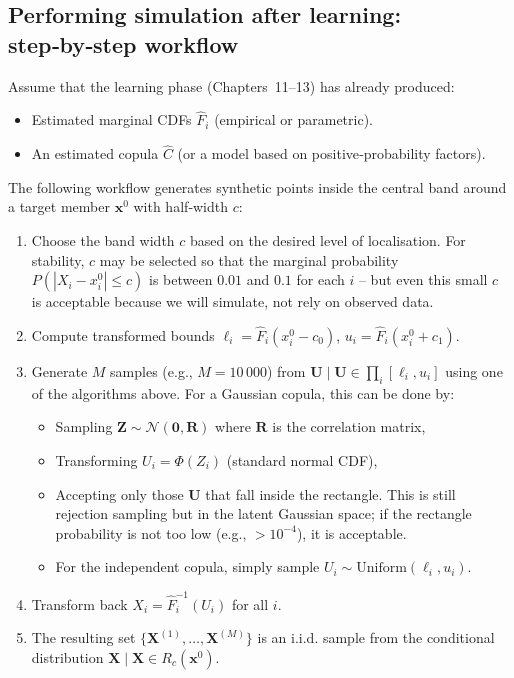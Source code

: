 \subsection{Performing simulation after learning: step‑by‑step workflow}

Assume that the learning phase (Chapters~11–13) has already produced:
\begin{itemize}
    \item Estimated marginal CDFs $\hat{F}_i$ (empirical or parametric).
    \item An estimated copula $\hat{C}$ (or a model based on positive‑probability factors).
\end{itemize}

The following workflow generates synthetic points inside the central band around a target member $\mathbf{x}^0$ with half‑width $c$:

\begin{enumerate}
    \item Choose the band width $c$ based on the desired level of localisation. For stability, $c$ may be selected so that the marginal probability $P(|X_i - x_i^0| \le c)$ is between $0.01$ and $0.1$ for each $i$ – but even this small $c$ is acceptable because we will simulate, not rely on observed data.
    \item Compute transformed bounds $\ell_i = \hat{F}_i(x_i^0 - c_0)$, $u_i = \hat{F}_i(x_i^0 + c_1)$.
    \item Generate $M$ samples (e.g., $M=10\,000$) from $\mathbf{U} \mid \mathbf{U} \in \prod_i [\ell_i, u_i]$ using one of the algorithms above. For a Gaussian copula, this can be done by:
    \begin{itemize}
        \item Sampling $\mathbf{Z} \sim \mathcal{N}(\mathbf{0}, \mathbf{R})$ where $\mathbf{R}$ is the correlation matrix,
        \item Transforming $U_i = \Phi(Z_i)$ (standard normal CDF),
        \item Accepting only those $\mathbf{U}$ that fall inside the rectangle. This is still rejection sampling but in the latent Gaussian space; if the rectangle probability is not too low (e.g., $ > 10^{-4}$), it is acceptable.
        \item For the independent copula, simply sample $U_i \sim \text{Uniform}(\ell_i, u_i)$.
    \end{itemize}
    \item Transform back $X_i = \hat{F}_i^{-1}(U_i)$ for all $i$.
    \item The resulting set $\{\mathbf{X}^{(1)},\dots,\mathbf{X}^{(M)}\}$ is an i.i.d. sample from the conditional distribution $\mathbf{X} \mid \mathbf{X} \in R_c(\mathbf{x}^0)$.
\end{enumerate}

